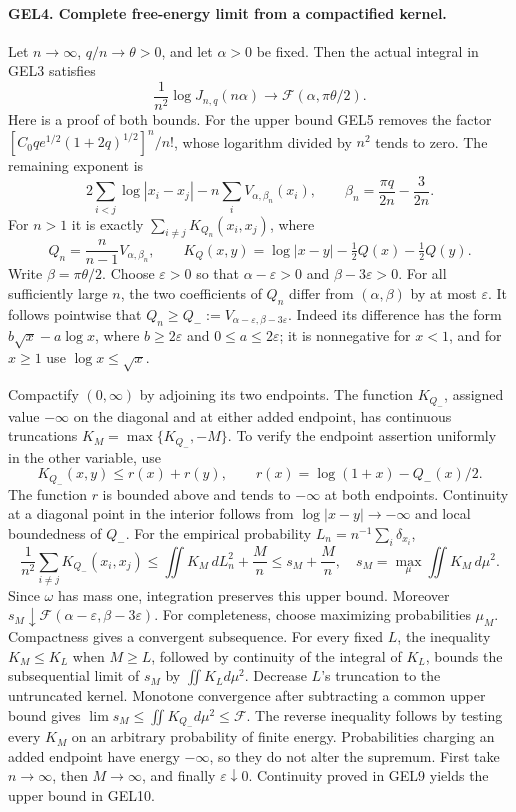 \paragraph{GEL4. Complete free-energy limit from a compactified kernel.}
Let \(n\to\infty\), \(q/n\to\theta>0\), and let \(\alpha>0\) be fixed.
Then the actual integral in GEL3 satisfies
\[
 \boxed{\frac1{n^2}\log J_{n,q}(n\alpha)
       \longrightarrow\mathcal F(\alpha,\pi\theta/2).}
 \tag{GEL10}
\]
Here is a proof of both bounds. For the upper bound GEL5 removes the
factor \([C_0q e^{1/2}(1+2q)^{1/2}]^n/n!\), whose logarithm divided by
\(n^2\) tends to zero. The remaining exponent is
\[
 2\sum_{i<j}\log|x_i-x_j|-n\sum_iV_{\alpha,\beta_n}(x_i),
 \qquad \beta_n=\frac{\pi q}{2n}-\frac3{2n}.
\]
For \(n>1\) it is exactly
\(\sum_{i\ne j}K_{Q_n}(x_i,x_j)\), where
\[
 Q_n=\frac n{n-1}V_{\alpha,\beta_n},\qquad
 K_Q(x,y)=\log|x-y|-\tfrac12Q(x)-\tfrac12Q(y).
\]
Write \(\beta=\pi\theta/2\). Choose \(\varepsilon>0\) so that
\(\alpha-\varepsilon>0\) and \(\beta-3\varepsilon>0\).
For all sufficiently large \(n\), the two coefficients of \(Q_n\)
differ from \((\alpha,\beta)\) by at most \(\varepsilon\). It follows
pointwise that
\(Q_n\geq Q_-:=V_{\alpha-\varepsilon,\beta-3\varepsilon}\).
Indeed its difference has the form
\(b\sqrt x-a\log x\), where \(b\geq2\varepsilon\) and
\(0\leq a\leq2\varepsilon\); it is nonnegative for \(x<1\), and for
\(x\geq1\) use \(\log x\leq\sqrt x\).

Compactify \((0,\infty)\) by adjoining its two endpoints.
The function \(K_{Q_-}\), assigned value \(-\infty\) on the diagonal
and at either added endpoint, has continuous truncations
\(K_M=\max\{K_{Q_-},-M\}\). To verify the endpoint assertion uniformly
in the other variable, use
\[
 K_{Q_-}(x,y)\leq r(x)+r(y),\qquad
 r(x)=\log(1+x)-Q_-(x)/2.
\]
The function \(r\) is bounded above and tends to \(-\infty\) at both
endpoints. Continuity at a diagonal point in the interior follows from
\(\log|x-y|\to-\infty\) and local boundedness of \(Q_-\).
For the empirical probability \(L_n=n^{-1}\sum_i\delta_{x_i}\),
\[
 \frac1{n^2}\sum_{i\ne j}K_{Q_-}(x_i,x_j)
 \leq\iint K_M\,dL_n^2+\frac Mn
 \leq s_M+\frac Mn,
 \quad s_M=\max_{\mu}\iint K_M\,d\mu^2.
\]
Since \(\omega\) has mass one, integration preserves this upper bound.
Moreover \(s_M\downarrow\mathcal F(\alpha-\varepsilon,
\beta-3\varepsilon)\). For completeness, choose maximizing probabilities
\(\mu_M\). Compactness gives a convergent subsequence. For every fixed
\(L\), the inequality \(K_M\leq K_L\) when \(M\geq L\), followed by
continuity of the integral of \(K_L\), bounds the subsequential limit
of \(s_M\) by \(\iint K_Ld\mu^2\). Decrease \(L\)'s truncation to the
untruncated kernel. Monotone convergence after subtracting a common upper
bound gives \(\lim s_M\leq\iint K_{Q_-}d\mu^2\leq\mathcal F\).
The reverse inequality follows by testing every \(K_M\) on an arbitrary
probability of finite energy. Probabilities charging an added endpoint
have energy \(-\infty\), so they do not alter the supremum.
First take \(n\to\infty\), then \(M\to\infty\), and finally
\(\varepsilon\downarrow0\). Continuity proved in GEL9 yields the
upper bound in GEL10.

